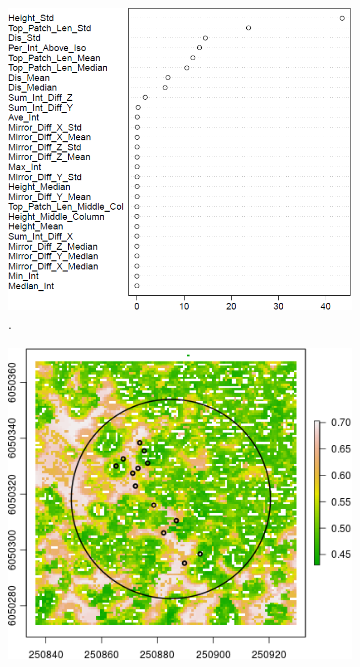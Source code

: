 \documentclass{subfiles}
\begin{document}
	
	\begin{figure} [h!]			
		\begin{subfigure}[t]{.49\textwidth}
			
			\centering
			\includegraphics[width=\textwidth]{img/dead/c0_random_forest}
			\caption{.}
			\label{fig:c0_RandomForest}
		\end{subfigure} \hfill
		\begin{subfigure}[t]{.49\textwidth}
			\centering
			\includegraphics[width=\textwidth]{img/dead/c1_knn}

\end{subfigure}
\end{figure}
\end{document}

